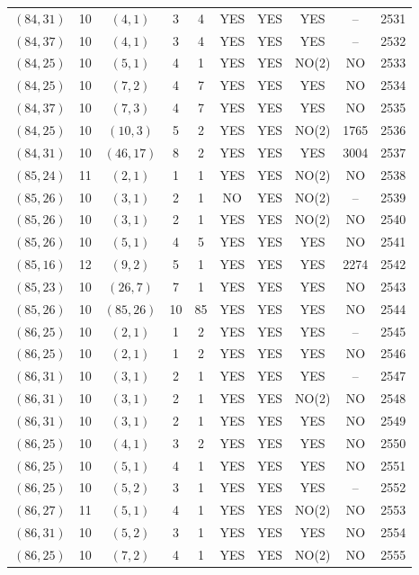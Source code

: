 \begin{longtable}{|c|c|c|c|c|c|c|c|c|c|}
$(84, 31)$ & 10 & $(4, 1)$ & 3 & 4 & YES & YES & YES & -- & 2531\\
$(84, 37)$ & 10 & $(4, 1)$ & 3 & 4 & YES & YES & YES & -- & 2532\\
$(84, 25)$ & 10 & $(5, 1)$ & 4 & 1 & YES & YES & NO(2) & NO & 2533\\
$(84, 25)$ & 10 & $(7, 2)$ & 4 & 7 & YES & YES & YES & NO & 2534\\
$(84, 37)$ & 10 & $(7, 3)$ & 4 & 7 & YES & YES & YES & NO & 2535\\
$(84, 25)$ & 10 & $(10, 3)$ & 5 & 2 & YES & YES & NO(2) & 1765 & 2536\\
$(84, 31)$ & 10 & $(46, 17)$ & 8 & 2 & YES & YES & YES & 3004 & 2537\\
$(85, 24)$ & 11 & $(2, 1)$ & 1 & 1 & YES & YES & NO(2) & NO & 2538\\
$(85, 26)$ & 10 & $(3, 1)$ & 2 & 1 & NO & YES & NO(2) & -- & 2539\\
$(85, 26)$ & 10 & $(3, 1)$ & 2 & 1 & YES & YES & NO(2) & NO & 2540\\
$(85, 26)$ & 10 & $(5, 1)$ & 4 & 5 & YES & YES & YES & NO & 2541\\
$(85, 16)$ & 12 & $(9, 2)$ & 5 & 1 & YES & YES & YES & 2274 & 2542\\
$(85, 23)$ & 10 & $(26, 7)$ & 7 & 1 & YES & YES & YES & NO & 2543\\
$(85, 26)$ & 10 & $(85, 26)$ & 10 & 85 & YES & YES & YES & NO & 2544\\
$(86, 25)$ & 10 & $(2, 1)$ & 1 & 2 & YES & YES & YES & -- & 2545\\
$(86, 25)$ & 10 & $(2, 1)$ & 1 & 2 & YES & YES & YES & NO & 2546\\
$(86, 31)$ & 10 & $(3, 1)$ & 2 & 1 & YES & YES & YES & -- & 2547\\
$(86, 31)$ & 10 & $(3, 1)$ & 2 & 1 & YES & YES & NO(2) & NO & 2548\\
$(86, 31)$ & 10 & $(3, 1)$ & 2 & 1 & YES & YES & YES & NO & 2549\\
$(86, 25)$ & 10 & $(4, 1)$ & 3 & 2 & YES & YES & YES & NO & 2550\\
$(86, 25)$ & 10 & $(5, 1)$ & 4 & 1 & YES & YES & YES & NO & 2551\\
$(86, 25)$ & 10 & $(5, 2)$ & 3 & 1 & YES & YES & YES & -- & 2552\\
$(86, 27)$ & 11 & $(5, 1)$ & 4 & 1 & YES & YES & NO(2) & NO & 2553\\
$(86, 31)$ & 10 & $(5, 2)$ & 3 & 1 & YES & YES & YES & NO & 2554\\
$(86, 25)$ & 10 & $(7, 2)$ & 4 & 1 & YES & YES & NO(2) & NO & 2555\\

\end{longtable}
